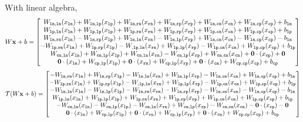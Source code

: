 \documentclass{article}
\begin{document}
With linear algebra,
$$
W\mathbf{x} +b =
\begin{bmatrix}
W_{\tt ln,ln} (x_{\tt ln}) + W_{\tt ln,lp} (x_{\tt lp}) + W_{\tt ln,rn} (x_{\tt rn}) + W_{\tt ln,rp} (x_{\tt rp}) + W_{\tt ln,cn} (x_{\tt cn}) + W_{\tt ln,cp} (x_{\tt cp}) + b_{\tt ln}\\ 
W_{\tt lp,ln} (x_{\tt ln}) + W_{\tt lp,lp} (x_{\tt lp}) + W_{\tt lp,rn} (x_{\tt rn}) + W_{\tt lp,rp} (x_{\tt rp}) + W_{\tt lp,cn} (x_{\tt cn}) + W_{\tt lp,cp} (x_{\tt cp}) + b_{\tt lp}\\ 
W_{\tt ln, rn} (x_{\tt ln}) - W_{\tt ln, rp} (x_{\tt lp}) + W_{\tt ln,ln} (x_{\tt rn}) - W_{\tt ln,lp} (x_{\tt rp}) + W_{\tt ln,cn} (x_{\tt cn}) - W_{\tt ln, cp} (x_{\tt cp}) - b_{\tt ln}\\
-W_{\tt lp,rn} (x_{\tt ln}) + W_{\tt lp,rp} (x_{\tt lp}) - W_{\tt, lp,ln} (x_{\tt rn}) + W_{\tt lp,lp} (x_{\tt rp}) - W_{\tt lp, cn} (x_{\tt cn}) + W_{\tt lp,cp} (x_{\tt cp}) + b_{\tt lp}\\ 
W_{\tt cn,ln} (x_{\tt ln}) + W_{\tt cn, lp} (x_{\tt lp}) + W_{\tt cn,ln} (x_{\tt rn}) - W_{\tt cn, lp} (x_{\tt rp}) + W_{\tt cn,cn} (x_{\tt cn}) + \mathbf{0} \cdot (x_{\tt cp}) + \mathbf{0}\\
 \mathbf{0} \cdot (x_{\tt ln}) + W_{\tt cp, lp} (x_{\tt lp}) + \mathbf{0} \cdot (x_{\tt rn}) + W_{\tt cp,lp} (x_{\tt rp}) + \mathbf{0} \cdot (x_{\tt cn}) + W_{\tt cp,cp} (x_{\tt cp}) + b_{\tt cp}
\end{bmatrix}
$$
$$
\mathcal{T}(W\mathbf{x} +b) = 
\begin{bmatrix}
-W_{\tt ln, rn} (x_{\tt ln}) + W_{\tt ln, rp} (x_{\tt lp}) - W_{\tt ln,ln} (x_{\tt rn}) + W_{\tt ln,lp} (x_{\tt rp}) - W_{\tt ln,cn} (x_{\tt cn}) + W_{\tt ln, cp} (x_{\tt cp}) + b_{\tt ln}\\
-W_{\tt lp,rn} (x_{\tt ln}) + W_{\tt lp,rp} (x_{\tt lp}) - W_{\tt, lp,ln} (x_{\tt rn}) + W_{\tt lp,lp} (x_{\tt rp}) - W_{\tt lp, cn} (x_{\tt cn}) + W_{\tt lp,cp} (x_{\tt cp}) + b_{\tt lp}\\ 
-W_{\tt ln,ln} (x_{\tt ln}) - W_{\tt ln,lp} (x_{\tt lp}) - W_{\tt ln,rn} (x_{\tt rn}) - W_{\tt ln,rp} (x_{\tt rp}) - W_{\tt ln,cn} (x_{\tt cn}) - W_{\tt ln,cp} (x_{\tt cp}) - b_{\tt ln}\\ 
W_{\tt lp,ln} (x_{\tt ln}) + W_{\tt lp,lp} (x_{\tt lp}) + W_{\tt lp,rn} (x_{\tt rn}) + W_{\tt lp,rp} (x_{\tt rp}) + W_{\tt lp,cn} (x_{\tt cn}) + W_{\tt lp,cp} (x_{\tt cp}) + b_{\tt lp}\\ 
-W_{\tt cn,ln} (x_{\tt ln}) - W_{\tt cn, lp} (x_{\tt lp}) - W_{\tt cn,ln} (x_{\tt rn}) + W_{\tt cn, lp} (x_{\tt rp}) - W_{\tt cn,cn} (x_{\tt cn}) - \mathbf{0} \cdot (x_{\tt cp}) - \mathbf{0}\\
 \mathbf{0} \cdot (x_{\tt ln}) + W_{\tt cp, lp} (x_{\tt lp}) + \mathbf{0} \cdot (x_{\tt rn}) + W_{\tt cp,lp} (x_{\tt rp}) + \mathbf{0} \cdot (x_{\tt cn}) + W_{\tt cp,cp} (x_{\tt cp}) + b_{\tt cp}
\end{bmatrix}
$$
\end{document}
